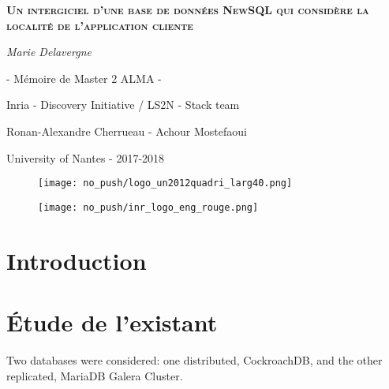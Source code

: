 \documentclass[a4paper, 10pt, titlepage]{report}
\begin{document}
%
\begin{titlepage}
	\centering
	{\scshape\LARGE\bfseries Un intergiciel d’une base de données NewSQL qui considère la localité de l’application cliente \par}
	\vspace{0cm}
	{\Large\itshape Marie Delavergne\par}
        {\Large - Mémoire de Master 2 ALMA -\par}

	\vfill

        {\Large Inria - Discovery Initiative / LS2N - Stack team\par}
        {\Large Ronan-Alexandre Cherrueau - Achour Mostefaoui \par}
	{\Large University of Nantes - 2017-2018 \par}

\begin{figure}[!h]\centering
   \begin{minipage}{0.3\textwidth}
     \centerline{\texttt{[image: no\_push/logo\_un2012quadri\_larg40.png]}}
     \label{Fig:univnantes}
   \end{minipage}
   \begin {minipage}{0.3\textwidth}
     \centerline{\texttt{[image: no\_push/inr\_logo\_eng\_rouge.png]}}
     \label{Fig:inria}
   \end{minipage}
\end{figure}



\end{titlepage}


\clearpage
\tableofcontents
\newpage

\section*{Introduction}


\section{Étude de l'existant}

Two databases were considered: one distributed, CockroachDB, and the other replicated, MariaDB Galera Cluster.
\end{document}
